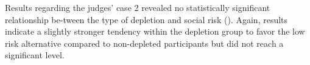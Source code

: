 Results regarding the judges’ case 2 revealed no statistically significant relationship be-tween the type of depletion and social risk (). Again, results indicate a slightly stronger tendency within the depletion group to favor the low risk alternative compared to non-depleted participants but did not reach a significant level.\par

\begin{figure}[!h]
\begin{floatrow}
\capbfigbox{%

}
\end{floatrow}
\end{figure}
